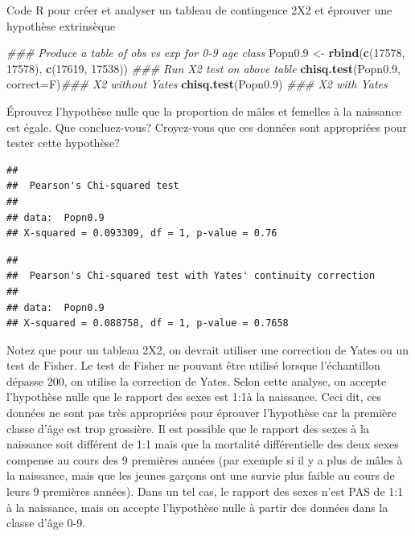 \documentclass[12pt,]{book}
\makeatletter
\newenvironment{Shaded}{\begin{snugshade}}{\end{snugshade}}
\newcommand{\CommentTok}[1]{\textcolor[rgb]{0.56,0.35,0.01}{\textit{#1}}}
\newcommand{\DataTypeTok}[1]{\textcolor[rgb]{0.13,0.29,0.53}{#1}}
\newcommand{\DecValTok}[1]{\textcolor[rgb]{0.00,0.00,0.81}{#1}}
\newcommand{\FloatTok}[1]{\textcolor[rgb]{0.00,0.00,0.81}{#1}}
\newcommand{\KeywordTok}[1]{\textcolor[rgb]{0.13,0.29,0.53}{\textbf{#1}}}
\newcommand{\NormalTok}[1]{#1}
\newcommand{\StringTok}[1]{\textcolor[rgb]{0.31,0.60,0.02}{#1}}
\newenvironment{kframe}{%
\medskip{}
\setlength{\fboxsep}{.8em}
\def\at@end@of@kframe{}%
\ifinner\ifhmode%
 \def\at@end@of@kframe{\end{minipage}}%
 \begin{minipage}{\columnwidth}%
\fi\fi%
\def\FrameCommand##1{\hskip\@totalleftmargin \hskip-\fboxsep
\colorbox{incolor}{##1}\hskip-\fboxsep
    \hskip-\linewidth \hskip-\@totalleftmargin \hskip\columnwidth}%
\MakeFramed {\advance\hsize-\width
  \@totalleftmargin\z@ \linewidth\hsize
  \@setminipage}}%
{\par\unskip\endMakeFramed%
\at@end@of@kframe}
\newenvironment{rmdblock}[1]
 {
 \begin{itemize}
 \renewcommand{\labelitemi}{
   \raisebox{-.7\height}[0pt][0pt]{
     {\setkeys{Gin}{width=3em,keepaspectratio}\texttt{[image: images/\#1]}}
   }
 }
 \begin{kframe}
 \setlength{\fboxsep}{1em}
 \item
 }
 {
 \end{kframe}
 \end{itemize}
 }
\newenvironment{rmdcode}
  {\begin{rmdblock}{screen}}
  {\end{rmdblock}}
\makeatother
\begin{document}
Code R pour créer et analyser un tableau de contingence 2X2 et éprouver une hypothèse extrinsèque

\begin{Shaded}
\begin{Highlighting}[]
\CommentTok{### Produce a table of obs vs exp for 0-9 age class}
\NormalTok{Popn0}\FloatTok{.9}\NormalTok{ <-}\StringTok{ }\KeywordTok{rbind}\NormalTok{(}\KeywordTok{c}\NormalTok{(}\DecValTok{17578}\NormalTok{, }\DecValTok{17578}\NormalTok{), }\KeywordTok{c}\NormalTok{(}\DecValTok{17619}\NormalTok{, }\DecValTok{17538}\NormalTok{))}
\CommentTok{### Run X2 test on above table}
\KeywordTok{chisq.test}\NormalTok{(Popn0}\FloatTok{.9}\NormalTok{, }\DataTypeTok{correct=}\NormalTok{F)}\CommentTok{### X2 without Yates}
\KeywordTok{chisq.test}\NormalTok{(Popn0}\FloatTok{.9}\NormalTok{) }\CommentTok{### X2 with Yates}
\end{Highlighting}
\end{Shaded}

\begin{rmdcode}
Éprouvez l'hypothèse nulle que la proportion de mâles et femelles à la naissance est égale. Que concluez-vous? Croyez-vous que ces données sont appropriées pour tester cette hypothèse?
\end{rmdcode}

\begin{verbatim}
## 
##  Pearson's Chi-squared test
## 
## data:  Popn0.9
## X-squared = 0.093309, df = 1, p-value = 0.76
\end{verbatim}

\begin{verbatim}
## 
##  Pearson's Chi-squared test with Yates' continuity correction
## 
## data:  Popn0.9
## X-squared = 0.088758, df = 1, p-value = 0.7658
\end{verbatim}

Notez que pour un tableau 2X2, on devrait utiliser une correction de Yates ou un test de Fisher. Le test de Fisher ne pouvant être utilisé lorsque l'échantillon dépasse 200, on utilise la correction de Yates. Selon cette analyse, on accepte l'hypothèse nulle que le rapport des sexes est 1:1à la naissance. Ceci dit, ces données ne sont pas très appropriées pour éprouver l'hypothèse car la première classe d'âge est trop grossière. Il est possible que le rapport des sexes à la naissance soit différent de 1:1 mais que la mortalité différentielle des deux sexes compense au cours des 9 premières années (par exemple si il y a plus de mâles à la naissance, mais que les jeunes garçons ont une survie plus faible au cours de leurs 9 premières années). Dans un tel cas, le rapport des sexes n'est PAS de 1:1 à la naissance, mais on accepte l'hypothèse nulle à partir des données dans la classe d'âge 0-9.
\end{document}
